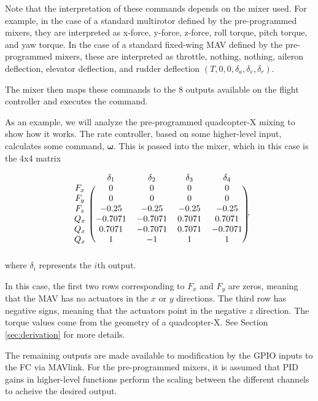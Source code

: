\documentclass{article}
\begin{document}
Note that the interpretation of these commands depends on the mixer used.
For example, in the case of a standard multirotor defined by the pre-programmed mixers, they are interpreted as x-force, y-force, z-force, roll torque, pitch torque, and yaw torque.
In the case of a standard fixed-wing MAV defined by the pre-programmed mixers, these are interpreted as throttle, nothing, nothing, aileron deflection, elevator deflection, and rudder deflection $(T, 0,0, \delta_a, \delta_e, \delta_r)$. 

The mixer then maps these commands to the 8 outputs available on the flight controller and executes the command.

As an example, we will analyze the pre-programmed quadcopter-X mixing to show how it works.
The rate controller, based on some higher-level input, calculates some command, $\bm{\omega}$.
This is passed into the mixer, which in this case is the 4x4 matrix

\begin{equation}
\begin{blockarray}{ccccc}
 & \delta_1 & \delta_2 & \delta_3 & \delta_4 \\
\begin{block}{c(cccc)}
    F_x & 0 & 0 & 0 & 0 \\
    F_y & 0 & 0 & 0 & 0 \\
    F_z & -0.25 & -0.25 & -0.25 & -0.25 \\
    Q_x & -0.7071 &-0.7071 & 0.7071 & 0.7071 \\
    Q_x & 0.7071 & -0.7071 & 0.7071 & -0.7071 \\
    Q_x & 1 &-1 & 1 & 1 \\
\end{block}
\end{blockarray},
\end{equation}
where $\delta_i$ represents the $i$th output.

In this case, the first two rows corresponding to $F_x$ and $F_y$ are zeros, meaning that the MAV has no actuators in the $x$ or $y$ directions.
The third row has negative signs, meaning that the actuators point in the negative $z$ direction.
The torque values come from the geometry of a quadcopter-X.
See Section \ref{sec:derivation} for more details.

The remaining outputs are made available to modification by the GPIO inputs to the FC via MAVlink.
For the pre-programmed mixers, it is assumed that PID gains in higher-level functions perform the scaling between the different channels to acheive the desired output.
\end{document}

